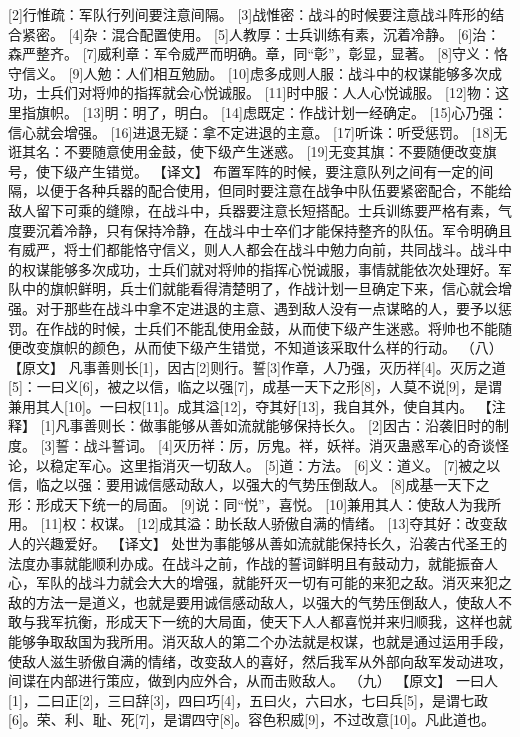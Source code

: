 \documentclass[a4paper,12pt,UTF8,twoside]{ctexbook}
\begin{document}
[2]行惟疏：军队行列间要注意间隔。
[3]战惟密：战斗的时候要注意战斗阵形的结合紧密。
[4]杂：混合配置使用。
[5]人教厚：士兵训练有素，沉着冷静。
[6]治：森严整齐。
[7]威利章：军令威严而明确。章，同“彰”，彰显，显著。
[8]守义：恪守信义。
[9]人勉：人们相互勉励。
[10]虑多成则人服：战斗中的权谋能够多次成功，士兵们对将帅的指挥就会心悦诚服。
[11]时中服：人人心悦诚服。
[12]物：这里指旗帜。
[13]明：明了，明白。
[14]虑既定：作战计划一经确定。
[15]心乃强：信心就会增强。
[16]进退无疑：拿不定进退的主意。
[17]听诛：听受惩罚。
[18]无诳其名：不要随意使用金鼓，使下级产生迷惑。
[19]无变其旗：不要随便改变旗号，使下级产生错觉。
【译文】
布置军阵的时候，要注意队列之间有一定的间隔，以便于各种兵器的配合使用，但同时要注意在战争中队伍要紧密配合，不能给敌人留下可乘的缝隙，在战斗中，兵器要注意长短搭配。士兵训练要严格有素，气度要沉着冷静，只有保持冷静，在战斗中士卒们才能保持整齐的队伍。军令明确且有威严，将士们都能恪守信义，则人人都会在战斗中勉力向前，共同战斗。战斗中的权谋能够多次成功，士兵们就对将帅的指挥心悦诚服，事情就能依次处理好。军队中的旗帜鲜明，兵士们就能看得清楚明了，作战计划一旦确定下来，信心就会增强。对于那些在战斗中拿不定进退的主意、遇到敌人没有一点谋略的人，要予以惩罚。在作战的时候，士兵们不能乱使用金鼓，从而使下级产生迷惑。将帅也不能随便改变旗帜的颜色，从而使下级产生错觉，不知道该采取什么样的行动。
（八）
【原文】
凡事善则长[1]，因古[2]则行。誓[3]作章，人乃强，灭历祥[4]。灭厉之道[5]：一曰义[6]，被之以信，临之以强[7]，成基一天下之形[8]，人莫不说[9]，是谓兼用其人[10]。一曰权[11]。成其溢[12]，夺其好[13]，我自其外，使自其内。
【注释】
[1]凡事善则长：做事能够从善如流就能够保持长久。
[2]因古：沿袭旧时的制度。
[3]誓：战斗誓词。
[4]灭历祥：厉，厉鬼。祥，妖祥。消灭蛊惑军心的奇谈怪论，以稳定军心。这里指消灭一切敌人。
[5]道：方法。
[6]义：道义。
[7]被之以信，临之以强：要用诚信感动敌人，以强大的气势压倒敌人。
[8]成基一天下之形：形成天下统一的局面。
[9]说：同“悦”，喜悦。
[10]兼用其人：使敌人为我所用。
[11]权：权谋。
[12]成其溢：助长敌人骄傲自满的情绪。
[13]夺其好：改变敌人的兴趣爱好。
【译文】
处世为事能够从善如流就能保持长久，沿袭古代圣王的法度办事就能顺利办成。在战斗之前，作战的誓词鲜明且有鼓动力，就能振奋人心，军队的战斗力就会大大的增强，就能歼灭一切有可能的来犯之敌。消灭来犯之敌的方法一是道义，也就是要用诚信感动敌人，以强大的气势压倒敌人，使敌人不敢与我军抗衡，形成天下一统的大局面，使天下人人都喜悦并来归顺我，这样也就能够争取敌国为我所用。消灭敌人的第二个办法就是权谋，也就是通过运用手段，使敌人滋生骄傲自满的情绪，改变敌人的喜好，然后我军从外部向敌军发动进攻，间谍在内部进行策应，做到内应外合，从而击败敌人。
（九）
【原文】
一曰人[1]，二曰正[2]，三曰辞[3]，四曰巧[4]，五曰火，六曰水，七曰兵[5]，是谓七政[6]。荣、利、耻、死[7]，是谓四守[8]。容色积威[9]，不过改意[10]。凡此道也。
\end{document}
